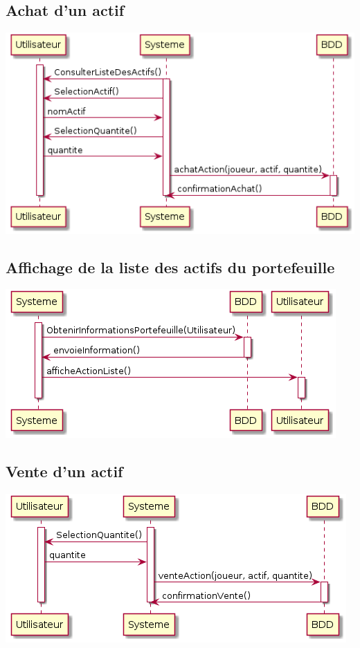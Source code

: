 \subsection{Achat d'un actif}
\includegraphics[scale=0.5]{../graph/DiagrammeSequenceAcheterActif.png} \\

\subsection{Affichage de la liste des actifs du portefeuille}
\includegraphics[scale=0.5]{../graph/DiagrammeSequenceAfficherListeAction.png} \\

\subsection{Vente d'un actif}
\includegraphics[scale=0.5]{../graph/DiagrammeSequenceVendreActif.png} \\

